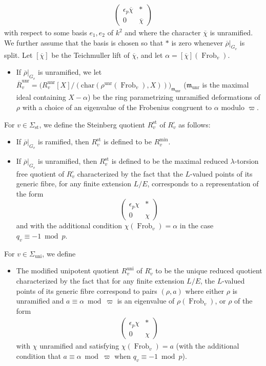 \documentclass[a4paper, notitlepage, 10pt]{amsart}
\theoremstyle{plain} %
\theoremstyle{definition} %
\theoremstyle{remark} %
\numberwithin{equation}{section}
\newcommand{\Frob}{\operatorname{Frob}} %
\newcommand{\uni}{\operatorname{uni}}
\newcommand{\unr}{\operatorname{unr}}
\newcommand{\st}{\operatorname{st}}
\begin{document}
\begin{align*}
    \begin{pmatrix}
        \epsilon_p \overline{\chi} & *
        \\ 0 & \overline{\chi}
    \end{pmatrix}
\end{align*}
with respect to some basis $e_1,e_2$ of $k^2$ and where the character $\overline{\chi}$ is unramified. We further assume that the basis is chosen so that $*$ is zero whenever $\overline{\rho}|_{G_{v}}$ is split. Let $[\overline{\chi}]$ be the Teichmuller lift of $\overline{\chi}$, and let $\alpha=[\overline{\chi}](\Frob_v)$.
\begin{itemize}
  \item If $\overline{\rho}|_{G_v}$ is unramified, we let $\overline{R}^{\unr}_v=\big(R^{\unr}_v[X]/(\mathrm{char}(\rho^{\unr}(\Frob_v),X))\big)_{\mathfrak{m}_{\unr}}$ ($\mathfrak{m}_{\unr}$ is the maximal ideal containing $X-\alpha$) be the ring parametrizing unramified deformations of $\rho$ with a choice of an eigenvalue of the Frobenius congruent to $\alpha$ modulo $\varpi$. 
\end{itemize}
For $v\in \Sigma_{\st}$, we define the Steinberg quotient $R^{\st}_v$ of $R_v^{\square}$ as follows:
\begin{itemize}
    \item If $\overline{\rho}|_{G_v}$ is ramified, then $R^{\st}_v$ is defined to be $R_v^{\min}$.
    \item If $\overline{\rho}|_{G_v}$ is unramified, then $R^{\st}_v$ is defined to be the maximal reduced $\lambda$-torsion free quotient of $R^\square_v$ characterized by the fact that the $L$-valued points of its generic fibre, for any finite extension $L/E$, corresponds to a representation of the form
    \begin{equation*}
         \begin{pmatrix}
            \epsilon_p \chi & * \\ 0 & \chi
        \end{pmatrix}
    \end{equation*}
    and with the additional condition $\chi(\Frob_v)=\alpha$ in the case $q_v\equiv-1 \bmod p$.
\end{itemize}
For $v\in \Sigma_{\uni}$, we define
\begin{itemize}
    \item The modified unipotent quotient $R_v^{\uni}$ of $R_v^{\square}$ to be the unique reduced quotient characterized by the fact that for any finite extension $L/E$, the $L$-valued points of its generic fibre correspond to pairs $(\rho,a)$ where either $\rho$ is unramified and $a\equiv \alpha\bmod\varpi$ is an eigenvalue of $\rho(\Frob_v)$, or $\rho$ of the form
        \begin{align*}
        \begin{pmatrix}
            \epsilon_p \chi & * \\ 0 & \chi
        \end{pmatrix}
    \end{align*}
    with $\chi$ unramified and satisfying $\chi(\Frob_v)=a$ (with the additional condition that $a\equiv\alpha \bmod \varpi$ when $q_v\equiv -1 \bmod p$).
\end{itemize}
\end{document}
